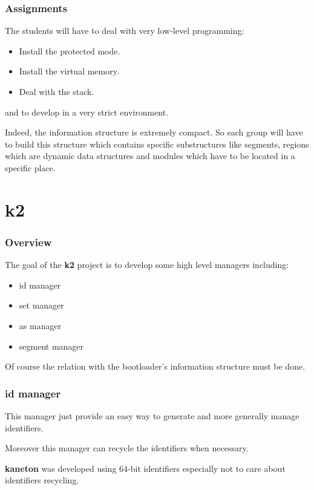 \begin{frame}
  \frametitle{Assignments}

  The students will have to deal with very low-level programming:

  \begin{itemize}[<+->]
    \item
      Install the protected mode.
    \item
      Install the virtual memory.
    \item
      Deal with the stack.
  \end{itemize}

  and to develop in a very strict environment.

  \nl

  Indeed, the information structure is extremely compact. So each group
  will have to build this structure which contains specific substructures
  like segments, regions which are dynamic data structures and modules
  which have to be located in a specific place.
\end{frame}

%
%

\section{k2}


\begin{frame}
  \frametitle{Overview}

  The goal of the \textbf{k2} project is to develop some high level
  managers including:

  \begin{itemize}[<+->]
    \item
      id manager
    \item
      set manager
    \item
      as manager
    \item
      segment manager
  \end{itemize}

  Of course the relation with the bootloader's information structure must
  be done.
\end{frame}


\begin{frame}
  \frametitle{id manager}

  This manager just provide an easy way to generate and more generally
  manage identifiers.

  \nl

  Moreover this manager can recycle the identifiers when necessary.

  \nl

  \textbf{kaneton} was developed using 64-bit identifiers especially not
  to care about identifiers recycling.
\end{frame}

